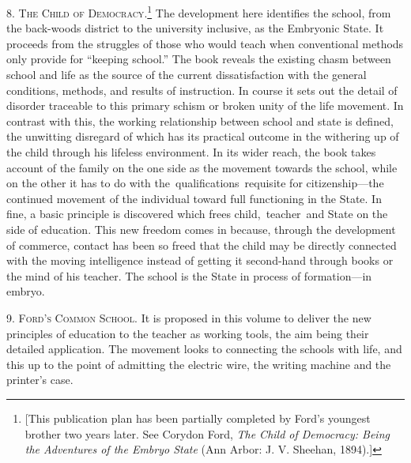 \documentclass[twoside,symmetric,nobib,justified]{tufte-book}
\begin{document}
8. \textsc{The Child of Democracy}.\footnote{{[}This publication plan has been
  partially completed by Ford's youngest brother two years later. See
  Corydon Ford, \emph{The Child of Democracy: Being the Adventures of
  the Embryo State} (Ann Arbor: J. V. Sheehan, 1894).{]}} The
development here identifies the school, from the back-woods district to
the university inclusive, as the Embryonic State. It proceeds from the
struggles of those who would teach when conventional methods only
provide for ``keeping school.'' The book reveals the existing chasm
between school and life as the source of the current dissatisfaction
with the general conditions, methods, and results of instruction. In
course it sets out the detail of disorder traceable to this primary
schism or broken unity of the life movement. In contrast with this, the
working relationship between school and state is defined, the unwitting
disregard of which has its practical outcome in the withering up of the
child through his lifeless environment. In its wider reach, the book
takes account of the family on the one side as the movement towards the
school, while on the other it has to do with
the~qualifications~requisite for citizenship---the continued movement of
the individual toward full functioning in the State. In fine, a basic
principle is discovered which frees child,~teacher~and State on the side
of education. This new freedom comes in because, through the development
of commerce, contact has been so freed that the child may be directly
connected with the moving intelligence instead of getting it second-hand
through books or the mind of his teacher. The school is the State in
process of formation---in embryo.~

\vspace{0.05in}

9. \textsc{Ford's Common School}. It is proposed in this volume to deliver the
new principles of education to the teacher as working tools, the aim
being their detailed application. The movement looks to connecting the
schools with life, and this up to the point of admitting the electric
wire, the writing machine and the printer's case.~

\vspace{0.05in}
\end{document}
